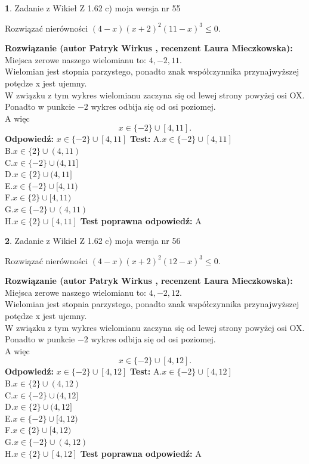 \documentclass[12pt, a4paper]{article}
\theoremstyle{definition} %
\newtheorem{zad}{}
\newcommand{\zadStart}[1]{\begin{zad}#1\newline}
\newcommand{\zadStop}{\end{zad}}
\newcommand{\rozwStart}[2]{\noindent \textbf{Rozwiązanie (autor #1 , recenzent #2): }\newline}
\newcommand{\rozwStop}{\newline}
\newcommand{\odpStart}{\noindent \textbf{Odpowiedź:}\newline}
\newcommand{\odpStop}{\newline}
\newcommand{\testStart}{\noindent \textbf{Test:}\newline}
\newcommand{\testStop}{\newline}
\newcommand{\kluczStart}{\noindent \textbf{Test poprawna odpowiedź:}\newline}
\newcommand{\kluczStop}{\newline}
\begin{document}
\zadStart{Zadanie z Wikieł Z 1.62 c) moja wersja nr 55}

Rozwiązać nierówności $(4-x)(x+2)^{2}(11-x)^{3}\le0$.
\zadStop
\rozwStart{Patryk Wirkus}{Laura Mieczkowska}
Miejsca zerowe naszego wielomianu to: $4, -2, 11$.\\
Wielomian jest stopnia parzystego, ponadto znak współczynnika przy\linebreak najwyższej potędze x jest ujemny.\\ W związku z tym wykres wielomianu zaczyna się od lewej strony powyżej osi OX.\\
Ponadto w punkcie $-2$ wykres odbija się od osi poziomej.\\
A więc $$x \in \{-2\} \cup [4,11].$$
\rozwStop
\odpStart
$x \in \{-2\} \cup [4,11]$
\odpStop
\testStart
A.$x \in \{-2\} \cup [4,11]$\\
B.$x \in \{2\} \cup (4,11)$\\
C.$x \in \{-2\} \cup (4,11]$\\
D.$x \in \{2\} \cup (4,11]$\\
E.$x \in \{-2\} \cup [4,11)$\\
F.$x \in \{2\} \cup [4,11)$\\
G.$x \in \{-2\} \cup (4,11)$\\
H.$x \in \{2\} \cup [4,11]$
\testStop
\kluczStart
A
\kluczStop



\zadStart{Zadanie z Wikieł Z 1.62 c) moja wersja nr 56}

Rozwiązać nierówności $(4-x)(x+2)^{2}(12-x)^{3}\le0$.
\zadStop
\rozwStart{Patryk Wirkus}{Laura Mieczkowska}
Miejsca zerowe naszego wielomianu to: $4, -2, 12$.\\
Wielomian jest stopnia parzystego, ponadto znak współczynnika przy\linebreak najwyższej potędze x jest ujemny.\\ W związku z tym wykres wielomianu zaczyna się od lewej strony powyżej osi OX.\\
Ponadto w punkcie $-2$ wykres odbija się od osi poziomej.\\
A więc $$x \in \{-2\} \cup [4,12].$$
\rozwStop
\odpStart
$x \in \{-2\} \cup [4,12]$
\odpStop
\testStart
A.$x \in \{-2\} \cup [4,12]$\\
B.$x \in \{2\} \cup (4,12)$\\
C.$x \in \{-2\} \cup (4,12]$\\
D.$x \in \{2\} \cup (4,12]$\\
E.$x \in \{-2\} \cup [4,12)$\\
F.$x \in \{2\} \cup [4,12)$\\
G.$x \in \{-2\} \cup (4,12)$\\
H.$x \in \{2\} \cup [4,12]$
\testStop
\kluczStart
A
\kluczStop
\end{document}
